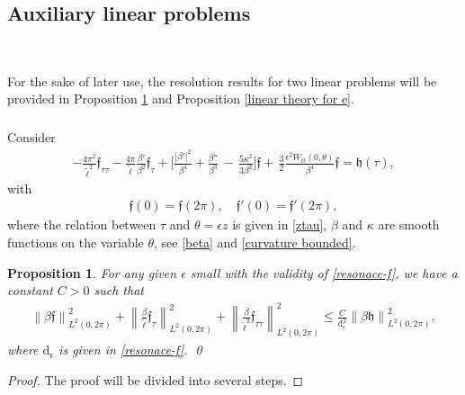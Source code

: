 \documentclass[10pt, reqno]{amsart}
\numberwithin{equation}{section}
\newtheorem{proposition}[theorem]{Proposition}
\theoremstyle{definition}
\begin{document}
{ \smallskip
\subsection{ Auxiliary linear problems} \label{Section8.1}\

For the sake of later use, the resolution results for two linear problems will be provided
in Proposition \ref{reduced tilde f boundarycondition-lemma} and Proposition \ref{linear theory for e}.

\subsubsection{}
Consider
\begin{align}
- \frac{4\pi^2}{{\tilde\ell}^2}{\mathfrak f}_{\tau\tau} - \frac{4\pi}{\tilde\ell} \frac{\beta'}{\beta^2}{\mathfrak f}_{\tau}
+ \Big[\frac{|\beta'|^2}{\beta^4}
+\frac{\beta''} {\beta^3}
\,-\,\frac{5\kappa^2}{3\beta^2} \Big]{\mathfrak f} + \, \frac 32\frac{\epsilon^2 W_{tt}(0, \theta)}{\beta^4} {\mathfrak f} = {\mathfrak h}(\tau),
\label{problem-auxil}
\end{align}
with
\begin{align}
{\mathfrak f}(0) = {\mathfrak f}(2\pi), \quad {\mathfrak f}'(0) = {\mathfrak f}'(2\pi),
\label{problem-auxil-boundary}
\end{align}
where the relation between $\tau$ and $\theta=\epsilon z$ is given in \eqref{ztau}, $\beta$ and $\kappa$ are smooth functions on the variable $\theta$, see \eqref{beta} and \eqref{curvature bounded}.

\begin{proposition} \label{reduced tilde f boundarycondition-lemma}
For any given $\epsilon$ small with the validity of \eqref{resonace-f}, we have a constant $C>0$ such that
\begin{align} \label{reduced mathfrak f boundarycondition}
\left\|\beta {\mathfrak f}\right\|_{L^2(0, 2\pi)}^2
+\left\|\frac{\beta}{\tilde\ell} {\mathfrak f}_\tau\right\|_{L^2(0, 2\pi)}^2
+\left\|\frac{\beta}{{\tilde\ell}^2} {\mathfrak f}_{\tau\tau}\right\|_{L^2(0, 2\pi)}^2
\leq
\frac{C}{{\mathrm d}_\epsilon^2}\left\|\beta {\mathfrak h}\right\|_{L^2(0, 2\pi)}^2,
\end{align}
where ${\mathrm d}_\epsilon$ is given in \eqref{resonace-f}.
\qed
\end{proposition}

\medskip
\begin{proof} The proof will be divided into several steps.


\end{proof}}
\end{document}
